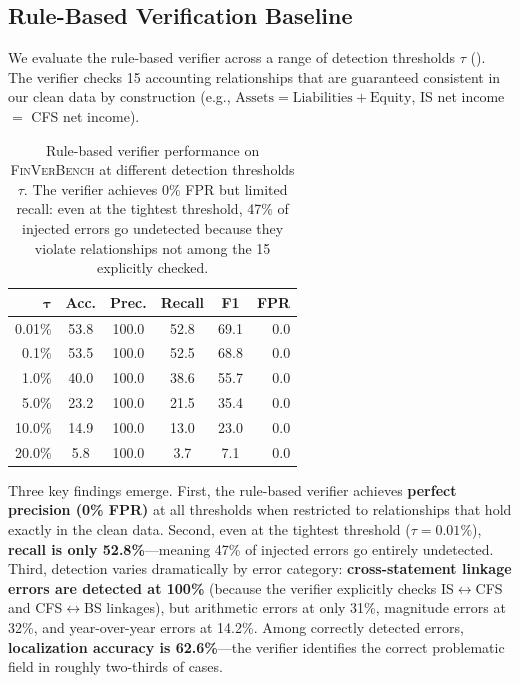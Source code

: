 \documentclass[11pt]{article}
\newcommand{\benchmark}{\textsc{FinVerBench}}
\begin{document}
\subsection{Rule-Based Verification Baseline}
\label{sec:results:baseline}

We evaluate the rule-based verifier across a range of detection thresholds $\tau$ ().
The verifier checks 15 accounting relationships that are guaranteed consistent in our clean data by construction (e.g., $\text{Assets} = \text{Liabilities} + \text{Equity}$, IS net income $=$ CFS net income).

\begin{table}[t]
\centering
\small
\caption{Rule-based verifier performance on \benchmark{} at different detection thresholds $\tau$.
The verifier achieves 0\% FPR but limited recall: even at the tightest threshold, 47\% of injected errors go undetected because they violate relationships not among the 15 explicitly checked.}
\label{tab:baseline}
\begin{tabular}{rccccr}
\toprule
$\bm{\tau}$ & \textbf{Acc.} & \textbf{Prec.} & \textbf{Recall} & \textbf{F1} & \textbf{FPR} \\
\midrule
0.01\% & 53.8 & 100.0 & 52.8 & 69.1 & 0.0 \\
0.1\%  & 53.5 & 100.0 & 52.5 & 68.8 & 0.0 \\
1.0\%  & 40.0 & 100.0 & 38.6 & 55.7 & 0.0 \\
5.0\%  & 23.2 & 100.0 & 21.5 & 35.4 & 0.0 \\
10.0\% & 14.9 & 100.0 & 13.0 & 23.0 & 0.0 \\
20.0\% & 5.8  & 100.0 & 3.7  & 7.1  & 0.0 \\
\bottomrule
\end{tabular}
\end{table}

Three key findings emerge.
First, the rule-based verifier achieves \textbf{perfect precision (0\% FPR)} at all thresholds when restricted to relationships that hold exactly in the clean data.
Second, even at the tightest threshold ($\tau = 0.01\%$), \textbf{recall is only 52.8\%}---meaning 47\% of injected errors go entirely undetected.
Third, detection varies dramatically by error category: \textbf{cross-statement linkage errors are detected at 100\%} (because the verifier explicitly checks IS$\leftrightarrow$CFS and CFS$\leftrightarrow$BS linkages), but arithmetic errors at only 31\%, magnitude errors at 32\%, and year-over-year errors at 14.2\%.
Among correctly detected errors, \textbf{localization accuracy is 62.6\%}---the verifier identifies the correct problematic field in roughly two-thirds of cases.
\end{document}

